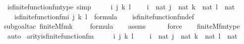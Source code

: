 \begin{isabellebody}
\isanewline
{}\isamarkupfalse%
\ is{\isacharunderscore}{\kern0pt}finite{\isacharunderscore}{\kern0pt}function{\isacharunderscore}{\kern0pt}fm{\isacharunderscore}{\kern0pt}type\ {\isacharbrackleft}{\kern0pt}simp{\isacharbrackright}{\kern0pt}\ {\isacharcolon}{\kern0pt}\ \isanewline
\ \ \ i\ j\ k\ l\ \isanewline
\ \ \ {\isachardoublequoteopen}i\ {\isasymin}\ nat{\isachardoublequoteclose}\ {\isachardoublequoteopen}j\ {\isasymin}\ nat{\isachardoublequoteclose}\ {\isachardoublequoteopen}k\ {\isasymin}\ nat{\isachardoublequoteclose}\ {\isachardoublequoteopen}l\ {\isasymin}\ nat{\isachardoublequoteclose}\ \isanewline
\ \ \ {\isachardoublequoteopen}is{\isacharunderscore}{\kern0pt}finite{\isacharunderscore}{\kern0pt}function{\isacharunderscore}{\kern0pt}fm{\isacharparenleft}{\kern0pt}i{\isacharcomma}{\kern0pt}\ j{\isacharcomma}{\kern0pt}\ k{\isacharcomma}{\kern0pt}\ l{\isacharparenright}{\kern0pt}\ {\isasymin}\ formula{\isachardoublequoteclose}\isanewline
%
\isadelimproof
\ \ %
\endisadelimproof
%
\isatagproof
{}\isamarkupfalse%
\ is{\isacharunderscore}{\kern0pt}finite{\isacharunderscore}{\kern0pt}function{\isacharunderscore}{\kern0pt}fm{\isacharunderscore}{\kern0pt}def\ \isanewline
\ \ \isamarkupfalse%
{\isacharparenleft}{\kern0pt}subgoal{\isacharunderscore}{\kern0pt}tac\ {\isachardoublequoteopen}finite{\isacharunderscore}{\kern0pt}M{\isacharunderscore}{\kern0pt}fm{\isacharparenleft}{\kern0pt}k\ {\isacharhash}{\kern0pt}{\isacharplus}{\kern0pt}\ {}{\isacharcomma}{\kern0pt}\ {}{\isacharparenright}{\kern0pt}\ {\isasymin}\ formula{\isachardoublequoteclose}{\isacharparenright}{\kern0pt}\isanewline
\ \ \isamarkupfalse%
\ assms\ \isanewline
\ \ \ \isamarkupfalse%
\ force\isanewline
\ \ \isamarkupfalse%
\ finite{\isacharunderscore}{\kern0pt}M{\isacharunderscore}{\kern0pt}fm{\isacharunderscore}{\kern0pt}type\isanewline
\ \ \isamarkupfalse%
\ auto%
\endisatagproof
{\isafoldproof}%
%
\isadelimproof
\isanewline
%
\endisadelimproof
\isanewline
{}\isamarkupfalse%
\ arity{\isacharunderscore}{\kern0pt}is{\isacharunderscore}{\kern0pt}finite{\isacharunderscore}{\kern0pt}function{\isacharunderscore}{\kern0pt}fm\ {\isacharcolon}{\kern0pt}\ \isanewline
\ \ \ i\ j\ k\ l\ \isanewline
\ \ \ {\isachardoublequoteopen}i\ {\isasymin}\ nat{\isachardoublequoteclose}\ {\isachardoublequoteopen}j\ {\isasymin}\ nat{\isachardoublequoteclose}\ {\isachardoublequoteopen}k\ {\isasymin}\ nat{\isachardoublequoteclose}\ {\isachardoublequoteopen}l\ {\isasymin}\ nat{\isachardoublequoteclose}\ \isanewline

\end{isabellebody}
